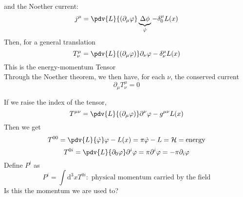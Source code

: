\documentclass[]{scrartcl}
\begin{document}
and the Noether current: 
\begin{equation}
j^\mu = \pdv{L}{(\partial_\mu\varphi}\underbrace{\Delta\phi}_{\dot{\varphi}} - \delta^\mu_0 L(x)
\end{equation}
Then, for a general translation
\begin{equation}
	T^\mu_\nu = \pdv{L}{(\partial_\mu\varphi)}\partial_\nu\varphi - \delta^\mu_\nu L(x)
\end{equation}
This is the energy-momentum Tensor\\
Through the Noether theorem, we then have, for each $\nu$, the conserved current
\begin{equation}
	\partial_\mu T^\mu_\nu = 0
\end{equation}

If we raise the index of the tensor,
\begin{equation}
	T^{\mu\nu} = \pdv{L}{(\partial_\mu\varphi)}\partial^\nu\varphi - g^{\mu\nu}L(x)
\end{equation}
Then we get
\begin{equation}
	T^{00} = \pdv{L}{\dot\varphi}\varphi - L(x) = \pi\dot\varphi - L = \mathcal{H} = \text{energy}
\end{equation}
\begin{equation}
	T^{0i} = \pdv{L}{\partial_0\varphi}\partial^i\varphi = \pi\partial^i\varphi = -\pi\partial_i\varphi
\end{equation}
Define $P^i$ as
\begin{equation}
	P^i = \int \text{d}^3x T^{0i}: \text{ physical momentum carried by the field}
\end{equation}
Is this the momentum we are used to?
\end{document}
